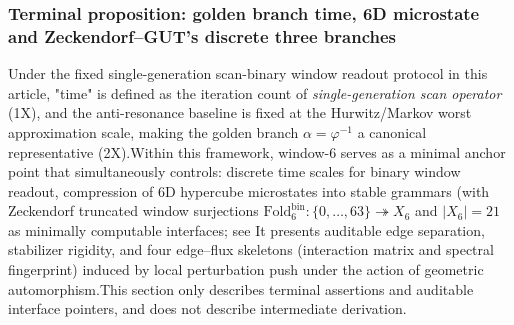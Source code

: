 \subsubsection{Terminal proposition: golden branch time, 6D microstate and Zeckendorf--GUT's discrete three branches}\label{subsubsec:window6-terminal-propositions}

Under the fixed single-generation scan-binary window readout protocol in this article, "time" is defined as the iteration count of \emph {single-generation scan operator} (\SXPH1X), and the anti-resonance baseline is fixed at the Hurwitz/Markov worst approximation scale, making the golden branch \(\alpha=\varphi^{-1}\) a canonical representative (\SXPH2X).Within this framework, window-\(6\) serves as a minimal anchor point that simultaneously controls: discrete time scales for binary window readout, compression of 6D hypercube microstates into stable grammars (with Zeckendorf truncated window surjections \(\mathrm{Fold}^{\mathrm{bin}}_6:\{0,\dots,63\}\twoheadrightarrow X_6\) and \(|X_6|=21\) as minimally computable interfaces; see It presents auditable edge separation, stabilizer rigidity, and four edge--flux skeletons (interaction matrix and spectral fingerprint) induced by local perturbation push under the action of geometric automorphism.This section only describes terminal assertions and auditable interface pointers, and does not describe intermediate derivation.
